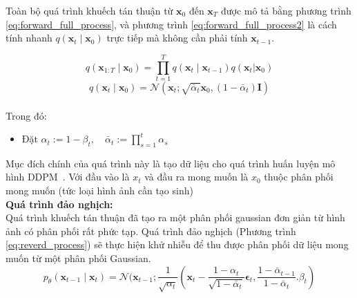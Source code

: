Toàn bộ quá trình khuếch tán thuận từ \(\mathbf{x}_0\) đến \(\mathbf{x}_T\) được mô tả bằng phương trình \ref{eq:forward_full_process}, và phương trình \ref{eq:forward_full_process2} là cách tính nhanh $q(\mathbf{x}_t \mid \mathbf{x}_0)$ trực tiếp mà không cần phải tính $\mathbf{x}_{t-1}$.

\begin{equation}
	q(\mathbf{x}_{1:T} \mid \mathbf{x}_0) = \prod_{t=1}^{T} q(\mathbf{x}_t \mid \mathbf{x}_{t-1})
	q(\mathbf{x}_t|\mathbf{x}_0)
	\label{eq:forward_full_process}
\end{equation}
%
\begin{equation}
	q(\mathbf{x}_t \mid \mathbf{x}_0) = \mathcal{N}(\mathbf{x}_t; \sqrt{\bar{\alpha}_t}\mathbf{x}_0,(1-\bar{\alpha}_t)\mathbf{I})
	\label{eq:forward_full_process2}
\end{equation} \\
%
Trong đó:
\begin{itemize}
	\item Đặt $\alpha_t := 1-\beta_t, \quad \bar\alpha_t := \prod_{s=1}^{t}\alpha_s$
\end{itemize}
%
Mục đích chính của quá trình này là tạo dữ liệu cho quá trình huấn luyện mô hình DDPM~\cite{Ho2020DenoisingDP}. Với đầu vào là \(x_t\) và đầu ra mong muốn là \({x}_0\) thuộc phân phối mong muốn (tức loại hình ảnh cần tạo sinh)\\
%
\textbf{Quá trình đảo nghịch:}\\
%
Quá trình khuếch tán thuận đã tạo ra một phân phối \Gls{gaussian} đơn giản từ hình ảnh có phân phối rất phức tạp. Quá trình đảo nghịch (Phương trình \ref{eq:reverd_process}) sẽ thực hiện khử nhiễu để thu được phân phối dữ liệu mong muốn từ một phân phối Gaussian.
%
\begin{equation}
	\mathit{p_\theta}(\mathbf{x}_{t-1} \mid \mathbf{x}_t) = \mathcal{N}(\mathbf{x}_{t-1}; \frac{1}{\sqrt{\alpha_t}}(\mathbf{x}_t - \frac{1-\alpha_t}{\sqrt{1-\bar\alpha_t}}\mathbf{\epsilon}_t, \frac{1-\bar\alpha_{t-1} }{1-\bar\alpha_t}.\beta_t)
	\label{eq:reverd_process}
\end{equation}
%

